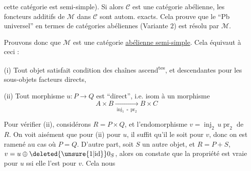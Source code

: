 cette catégorie est semi-simple). Si alors $\mathcal C$ est une catégorie abélienne, les foncteurs additifs de $\mathcal M$ dans $\mathcal C$ sont autom. exacts. Cela prouve que le ``Pb universel'' en termes de catégories abéliennes (Variante $2$) est résolu par $\mathcal M$.

Prouvons donc que $\mathcal M$ est une catégorie \uline{abélienne semi-simple}. Cela équivaut à ceci :


(i) Tout objet satisfait condition des chaînes ascend\textsuperscript{tes}, et descendantes pour les sous-objets facteurs directs,


(ii) Tout morphisme $u:P\longrightarrow Q$ est ``direct'', i.e. isom à un morphisme
\[
 A\times B\xrightarrow[\operatorname{inj}_1\circ\operatorname{pr}_2]{}B\times C
\]

Pour vérifier (ii),  considérons $R=P\times Q$, et l'endomorphisme  $v=\operatorname{inj}_2\,u\operatorname{pr}_2$ de $R$. On voit aisément que pour  (ii) pour $u$, il suffit  qu'il le soit pour $v$, donc on est ramené au cas où $P=Q$.
D'autre part, soit  $S$ un autre objet, et  $R=P+S$, $v=u\oplus\deleted{\unsure{1|\mathrm{id}}}0_S$, alors on constate que la propriété est vraie pour $u$ ssi elle l'est pour $v$. Cela nous
